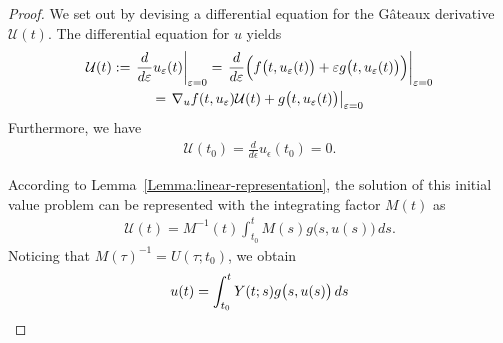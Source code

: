 

\begin{proof}
  We set out by devising a differential equation for the Gâteaux
  derivative $\mathcal U(t)$. The differential equation for $u$ yields
  \begin{multline*}
    \mathcal U(t) := \left.\frac{d}{d\epsilon} u_\epsilon(t)\right|_{\epsilon=0}
    = \left.\frac{d}{d\epsilon}
    \Bigl(f\bigl(t,u_\epsilon(t)\bigr)
    + \epsilon g\bigl(t,u_\epsilon(t)\bigr)\Bigr) \right|_{\epsilon=0}
  \\
    = \left.\nabla_u f(t,u_\epsilon) \mathcal U(t)
    + g\bigl(t,u_\epsilon(t)\bigr) \right|_{\epsilon=0}
  \end{multline*}
  Furthermore, we have
  \begin{gather*}
     \mathcal U(t_0) = \frac{d}{d\epsilon} u_\epsilon(t_0) = 0.
  \end{gather*}

  According to Lemma~\ref{Lemma:linear-representation}, the solution
  of this initial value problem can be represented with the
  integrating factor $M(t)$ as
  \begin{gather*}
    \mathcal U(t) = M^{-1}(t) \int_{t_0}^t M(s) g\bigl(s,u(s)\bigr)
    \,d s.
  \end{gather*}
  Noticing that $M(\tau)^{-1} = U(\tau;t_0)$, we obtain
  \begin{gather*}
    u(t) = \int_{t_0}^t \fundamental(t;s) g\bigl(s,u(s)\bigr) \,d s
  \end{gather*}
\end{proof}


